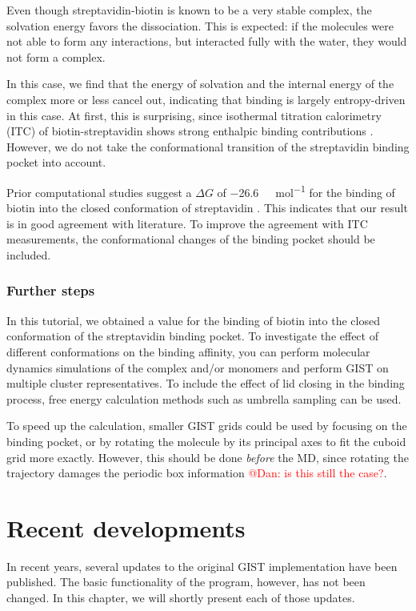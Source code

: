 \documentclass[9pt,tutorial]{livecoms}
\newcommand{\todo}{\textcolor{red}}
\begin{document}
Even though streptavidin-biotin is known to be a very stable complex, the solvation energy favors the dissociation.
This is expected: if the molecules were not able to form any interactions, but interacted fully with the water, they would not form a complex.

In this case, we find that the energy of solvation and the internal energy of the complex more or less cancel out, indicating that binding is largely entropy-driven in this case.
At first, this is surprising, since isothermal titration calorimetry (ITC) of biotin-streptavidin shows strong enthalpic binding contributions \cite{mpye2020-biotin-itc,hyre2006-biotin-itc}.
However, we do not take the conformational transition of the streptavidin binding pocket into account.

Prior computational studies suggest a $\Delta G$ of \SI{-26.6}{\kilo\calorie\per\mole} for the binding of biotin into the closed conformation of streptavidin \cite{Bansal2018-biotin}.
This indicates that our result is in good agreement with literature.
To improve the agreement with ITC measurements, the conformational changes of the binding pocket should be included.

\subsubsection{Further steps}
In this tutorial, we obtained a value for the binding of biotin into the closed conformation of the streptavidin binding pocket.
To investigate the effect of different conformations on the binding affinity, you can perform molecular dynamics simulations of the complex and/or monomers and perform GIST on multiple cluster representatives.
To include the effect of lid closing in the binding process, free energy calculation methods such as umbrella sampling can be used.

To speed up the calculation, smaller GIST grids could be used by focusing on the binding pocket, or by rotating the molecule by its principal axes to fit the cuboid grid more exactly.
However, this should be done \emph{before} the MD, since rotating the trajectory damages the periodic box information \todo{@Dan: is this still the case?}.

\section{Recent developments}
In recent years, several updates to the original GIST implementation have been published.
The basic functionality of the program, however, has not been changed.
In this chapter, we will shortly present each of those updates.
\end{document}
